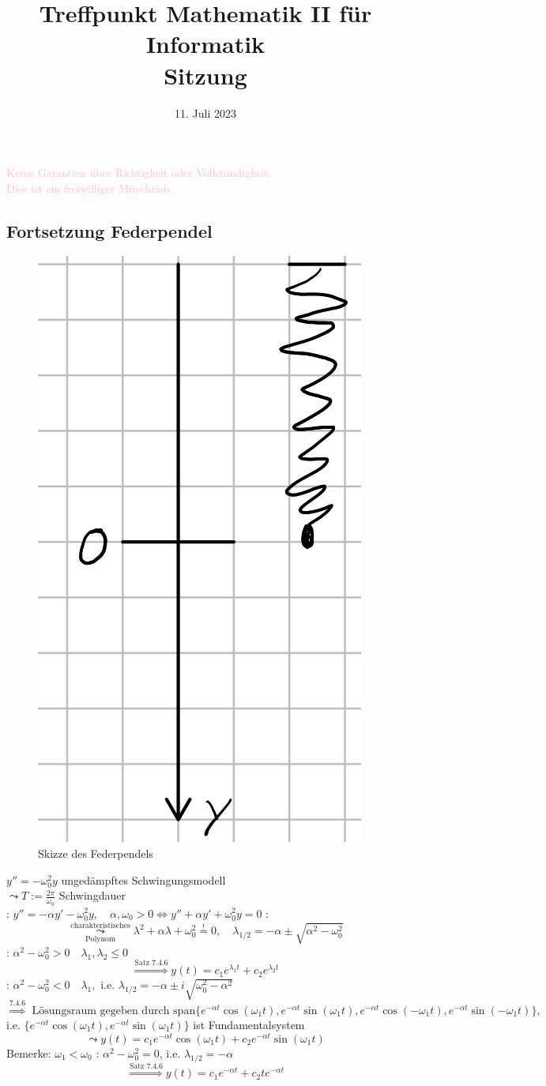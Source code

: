\documentclass[
    accentcolor=pink,
    boxarc,
    dark_mode,
    logofile=enmpty
]{rubos-tuda-template}
\date{11. Juli 2023}
\title[trans rights <3]{Treffpunkt Mathematik II für Informatik \\ Sitzung \getSheetnumber{}}
\begin{document}
    \maketitle{}

    \begin{anmerkung}
        \huge{\textcolor{pink}{Keine Garantien über Richtigkeit oder Vollständigkeit. \\ Dies ist ein freiwilliger Mitschrieb.}}
    \end{anmerkung}

    \subsection*{Fortsetzung Federpendel}
    \begin{figure}[H]
        \centering
        \includegraphics[keepaspectratio, width=.35\textwidth]{federpendel}
        \caption{Skizze des Federpendels}
    \end{figure}
    $y'' = -\omega_0^2y$ ungedämpftes Schwingungsmodell\\
    $\leadsto T := \frac{2\pi}{\omega_0}$ Schwingdauer\\
    : $y''=-\alpha y' -\omega_0^2y, \quad \alpha,\omega_0>0\Leftrightarrow y''+\alpha y'+\omega_0^2y=0$
    :
    \[\overset{\text{charakteristisches}}{\underset{\text{Polynom}}{\leadsto}}\lambda^2+\alpha\lambda+\omega_0^2 \overset{!}{=}0,\quad \lambda_{1/2}=-\alpha\pm\sqrt{\alpha^2-\omega_0^2}\]
    : $\alpha^2-\omega_0^2>0\quad\lambda_1,\lambda_2\le0$
    \[\overset{\text{Satz 7.4.6}}{\Rightarrow}y(t)=c_1e^{\lambda_1t}+c_2e^{\lambda_2t}\]
    : $\alpha^2-\omega_0^2<0\quad\lambda_1,\text{ i.e. }\lambda_{1/2}=-\alpha\pm i\sqrt{\omega_0^2-\alpha^2}$
    \[\overset{7.4.6}{\Rightarrow}\text{ Lösungsraum gegeben durch }\text{span}\{e^{-\alpha t}\cos(\omega_1t),e^{-\alpha t}\sin(\omega_1t),e^{-\alpha t}\cos(-\omega_1t),e^{-\alpha t}\sin(-\omega_1t)\},\]
    i.e. $\{e^{-\alpha t}\cos(\omega_1t),e^{-\alpha t}\sin(\omega_1t)\}$ ist Fundamentalsystem
    \[\leadsto y(t)=c_1e^{-\alpha t}\cos(\omega_1t)+c_2e^{-\alpha t}\sin(\omega_1t)\]
    Bemerke: $\omega_1 < \omega_0$
    : $\alpha^2-\omega_0^2=0$, i.e. $\lambda_{1/2}=-\alpha$
    \[\overset{\text{Satz 7.4.6}}{\Rightarrow}y(t)=c_1e^{-\alpha t}+c_2te^{-\alpha t}\]
\end{document}
